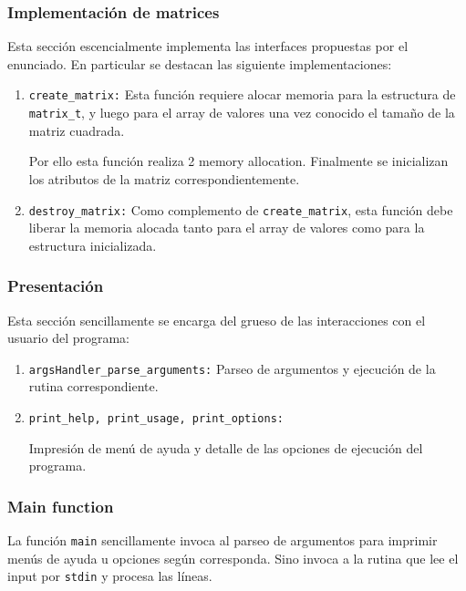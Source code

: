 \documentclass[a4paper,10pt, spanish]{article}
\begin{document}
\subsubsection{Implementación de matrices}

Esta sección escencialmente implementa las interfaces propuestas por el enunciado. En particular se destacan las siguiente implementaciones:

\begin{enumerate}
	\item \lstinline{create_matrix:} Esta función requiere alocar memoria para la estructura de \lstinline{matrix_t}, y luego para el array de valores una vez conocido el tamaño de la matriz cuadrada.
  
  Por ello esta función realiza 2 memory allocation. Finalmente se inicializan los atributos de la matriz correspondientemente.
  
  \item \lstinline{destroy_matrix:} Como complemento de \lstinline{create_matrix}, esta función debe liberar la memoria alocada tanto para el array de valores como para la estructura inicializada.
\end{enumerate}

\subsubsection{Presentación}

Esta sección sencillamente se encarga del grueso de las interacciones con el usuario del programa:

\begin{enumerate}
	\item \lstinline{argsHandler_parse_arguments:} Parseo de argumentos y ejecución de la rutina correspondiente.
  \item \lstinline{print_help, print_usage, print_options:} 
  
  Impresión de menú de ayuda y detalle de las opciones de ejecución del programa.
\end{enumerate}

\subsubsection{Main function}

La función \lstinline{main} sencillamente invoca al parseo de argumentos para imprimir menús de ayuda u opciones según corresponda. 
Sino invoca a la rutina que lee el input por \lstinline{stdin} y procesa las líneas.
\end{document}
